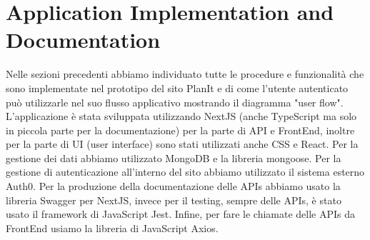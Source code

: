 \section{Application Implementation and Documentation}
\label{secD4:ApplicationImplementationAndDocumentation}
Nelle sezioni precedenti abbiamo individuato tutte le procedure e funzionalità che sono implementate nel prototipo del sito PlanIt e di come l'utente autenticato può utilizzarle nel suo flusso applicativo mostrando il diagramma "user flow". L'applicazione è stata sviluppata utilizzando NextJS (anche TypeScript ma solo in piccola parte per la documentazione) per la parte di API e FrontEnd, inoltre per la parte di UI (user interface) sono stati utilizzati anche CSS e React. Per la gestione dei dati abbiamo utilizzato MongoDB e la libreria mongoose. Per la gestione di autenticazione all'interno del sito abbiamo utilizzato il sistema esterno Auth0. Per la produzione della documentazione delle APIs abbiamo usato la libreria Swagger per NextJS, invece per il testing, sempre delle APIs, è stato usato il framework di JavaScript Jest. Infine, per fare le chiamate delle APIs da FrontEnd usiamo la libreria di JavaScript Axios.
